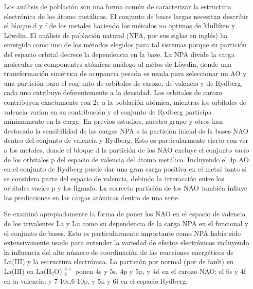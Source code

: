 Los an\'alisis de poblaci\'on son una forma com\'un de caracterizar
la estructura electr\'onica de los \'atomo met\'alicos. El conjunto 
de bases largas necesitan describir el bloque d y f de los metales
haciendo los m\'etodos no optimos de Mulliken y L\"owdin. El 
an\'alisis de poblaci\'on natural (NPA, por sus siglas en ingl\'es)
ha emergido como uno de los m\'etodos elegidos para tal sistemas 
porque su partici\'on del espacio orbital decrece la dependencia en 
la base. La NPA divide la carga molecular en componentes at\'omicas
an\'alogo al m\'etos de L\"owdin, donde una transformaci\'on 
sim\'etrica de ocupancia pesada es usada para seleccionar un AO y una
partici\'on para el conjunto de orbitales de carozo, de valencia y de
Rydberg, cada uno cntribuye deferentemente a la densidad. Los 
orbitales de carozo contribuyen exactamente con $2e$ a la poblaci\'on 
at\'omica, mientras los orbitales de valencia var\'ian en su 
contribuci\'on y el conjunto de Rydberg participa m\'inimamente en la
carga. En previos estudios, nuestro grupo y otros han destacado la
sensibilidad de las cargas NPA a la partici\'on inicial de la bases 
NAO dentro del conjunto de valencia y Rydberg. Esto es 
particularmente cierto  con ver a los metales, donde el bloque d la 
partici\'on de los NAO excluye el conjunto vac\'io de los orbitales p
del espacio de valencia del \'atomo met\'alico. Incluyendo el 4p AO 
en el conjunto de Rydberg  puede dar una gran carga positiva en el 
metal tanto si se considera parte del espacio de valencia, debindo la
interacci\'on  entre los orbitales vacios p y los ligando. La 
correcta partici\'on  de los NAO tambi\'en influye las predicciones 
en las cargas at\'omicas dentro de una serie.

Se examin\'o apropiadamente la forma de poner los NAO en el espacio 
de valencia  de los trivalentes La y Lu como su dependencia de la
carga NPA en el funcional y el conjunto de bases. Esto es 
particularmente importante como NPA hab\'ia sido extensivamente usado
para entender la variedad de efectos electr\'onicos incluyendo la 
influencia del alto n\'umero de coordinaci\'on de las reacciones
energ\'eticos de Ln(III) y la escructura electr\'onica. La 
partici\'on por normal (por de fault) en La(III) en La(H$_2$O)
$_8^{3+}$ ponen 4s y 5s, 4p y 5p, y 4d en el carozo NAO; el 6s y 4f
en la valencia; y 7-10s,6-10p, y 5h y 6f en el espacio Rydberg.
